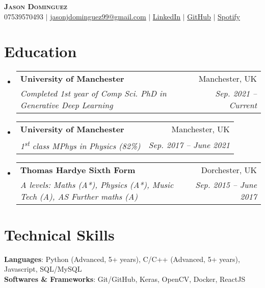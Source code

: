 \documentclass[letterpaper,11pt]{article}
\makeatletter
\newcommand{\resumeSubheading}[4]{
  \vspace{-2pt}\item
    \begin{tabular*}{0.97\textwidth}[t]{l@{\extracolsep{\fill}}r}
      \textbf{#1} & #2 \\
      \textit{\small#3} & \textit{\small #4} \\
    \end{tabular*}\vspace{-7pt}
}
\newcommand{\resumeSubHeadingListStart}{\begin{itemize}[leftmargin=0.15in, label={}]}
\newcommand{\resumeSubHeadingListEnd}{\end{itemize}}
\makeatother
\begin{document}

\begin{center}
    \textbf{\Huge \scshape Jason Dominguez} \\ \vspace{1pt}
    \small 07539570493 $|$ \href{mailto:jasonjdominguez99@gmail.com}{\underline{jasonjdominguez99@gmail.com}} $|$ 
    \href{https://www.linkedin.com/in/jasonjdominguez99/}{\underline{LinkedIn}} $|$
    \href{https://github.com/jasonjdominguez99}{\underline{GitHub}} $|$
    \href{https://open.spotify.com/artist/6vROqVU2bVHOp3V4q09ljN?si=fedCBXksTGm1AKXGwlDVHA}{\underline{Spotify}}
\end{center}


\section{Education}
  \resumeSubHeadingListStart
    \resumeSubheading
      {University of Manchester}{Manchester, UK}
      {Completed 1st year of Comp Sci. PhD in Generative Deep Learning}{Sep. 2021 -- Current}
    \resumeSubheading
      {University of Manchester}{Manchester, UK}
      {1\textsuperscript{st} class MPhys in Physics (82\%)}{Sep. 2017 -- June 2021}
    \resumeSubheading
      {Thomas Hardye Sixth Form}{Dorchester, UK}
      {A levels: Maths (A*), Physics (A*), Music Tech (A), AS Further maths (A)}{Sep. 2015 -- June 2017}
  \resumeSubHeadingListEnd

\section{Technical Skills}
 \begin{itemize}[leftmargin=0.15in, label={}]
    \small{\item{
     \textbf{Languages}{: Python (Advanced, 5+ years), C/C++ (Advanced, 5+ years), Javascript, SQL/MySQL} \\
     \textbf{Softwares \& Frameworks}{: Git/GitHub, Keras, OpenCV, Docker, ReactJS} \\
     
    }}
 \end{itemize}
 
\end{document}
